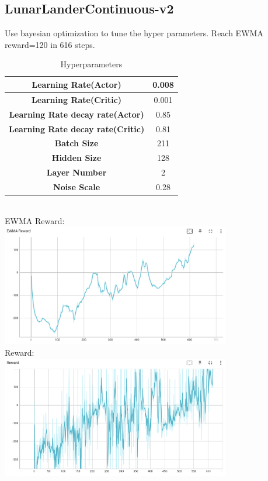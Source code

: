\documentclass{article} %
\begin{document}
    \subsection{LunarLanderContinuous-v2}
    Use bayesian optimization to tune the hyper parameters. Reach EWMA reward=120 in 616 steps.
    \begin{table}[h]
        \centering
        \begin{tabular}{|c|c|}
        \hline
        \textbf{Learning Rate(Actor)} & 0.008 \\ \hline
        \textbf{Learning Rate(Critic)} & 0.001 \\ \hline
        \textbf{Learning Rate decay rate(Actor)} & 0.85 \\ \hline
        \textbf{Learning Rate decay rate(Critic)} & 0.81 \\ \hline
        \textbf{Batch Size} & 211 \\ \hline
        \textbf{Hidden Size} & 128 \\ \hline 
        \textbf{Layer Number} & 2 \\ \hline
        \textbf{Noise Scale} & 0.28 \\ \hline 
        \end{tabular}
        \caption{Hyperparameters}
        \label{tab:ddpg_results}
    \end{table}
    \\
    EWMA Reward: \\
    \includegraphics[width=10cm]{./imgs/lunarlander/ewma_rw.png} \\
    Reward: \\
    \includegraphics[width=10cm]{./imgs/lunarlander/rw.png} \\
\end{document}

